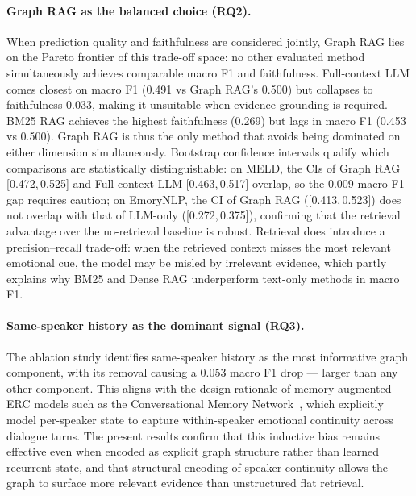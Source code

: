 \documentclass[runningheads]{llncs}
\begin{document}
\paragraph{Graph RAG as the balanced choice (RQ2).}
When prediction quality and faithfulness are considered jointly, Graph
RAG lies on the Pareto frontier of this trade-off space: no other
evaluated method simultaneously achieves comparable macro F1 and
faithfulness. Full-context LLM comes closest on macro F1 (0.491 vs
Graph RAG's 0.500) but collapses to faithfulness 0.033, making it
unsuitable when evidence grounding is required. BM25 RAG achieves the
highest faithfulness (0.269) but lags in macro F1 (0.453 vs 0.500).
Graph RAG is thus the only method that avoids being dominated on either
dimension simultaneously. Bootstrap confidence intervals qualify which
comparisons are statistically distinguishable: on MELD, the CIs of
Graph RAG [0.472,\,0.525] and Full-context LLM [0.463,\,0.517] overlap,
so the 0.009 macro F1 gap requires caution; on EmoryNLP, the CI of Graph
RAG ([0.413,\,0.523]) does not overlap with that of LLM-only
([0.272,\,0.375]), confirming that the retrieval advantage over the
no-retrieval baseline is robust. Retrieval does introduce a
precision--recall trade-off: when the retrieved context misses the most
relevant emotional cue, the model may be misled by irrelevant evidence,
which partly explains why BM25 and Dense RAG underperform text-only
methods in macro F1.

\paragraph{Same-speaker history as the dominant signal (RQ3).}
The ablation study identifies same-speaker history as the most
informative graph component, with its removal causing a 0.053 macro F1
drop — larger than any other component. This aligns with the design
rationale of memory-augmented ERC models such as the Conversational
Memory Network~\cite{hazarika2018conversational}, which explicitly model
per-speaker state to capture within-speaker emotional continuity across
dialogue turns. The present results confirm that this inductive bias
remains effective even when encoded as explicit graph structure rather
than learned recurrent state, and that structural encoding of speaker
continuity allows the graph to surface more relevant evidence than
unstructured flat retrieval.
\end{document}
